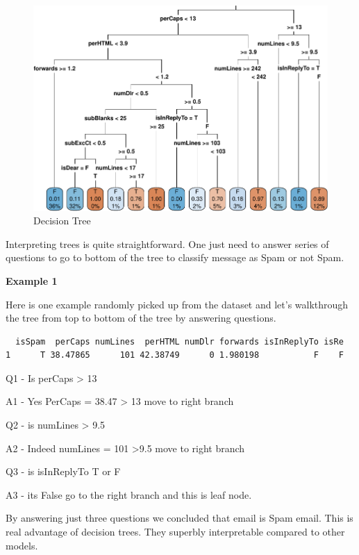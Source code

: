 \documentclass[
]{article}
\begin{document}
\begin{figure}[H]
\includegraphics{case_study03_files/figure-latex/unnamed-chunk-29-1} \caption{Decision Tree}\label{fig:unnamed-chunk-29}
\end{figure}

Interpreting trees is quite straightforward. One just need to answer
series of questions to go to bottom of the tree to classify message as
Spam or not Spam.

\textbf{Example 1}

Here is one example randomly picked up from the dataset and let's
walkthrough the tree from top to bottom of the tree by answering
questions.

\begin{verbatim}
  isSpam  perCaps numLines  perHTML numDlr forwards isInReplyTo isRe
1      T 38.47865      101 42.38749      0 1.980198           F    F
\end{verbatim}

Q1 - Is perCaps \textgreater{} 13

A1 - Yes PerCaps = 38.47 \textgreater{} 13 move to right branch

Q2 - is numLines \textgreater{} 9.5

A2 - Indeed numLines = 101 \textgreater9.5 move to right branch

Q3 - is isInReplyTo T or F

A3 - its False go to the right branch and this is leaf node.

By answering just three questions we concluded that email is Spam email.
This is real advantage of decision trees. They superbly interpretable
compared to other models.
\end{document}
